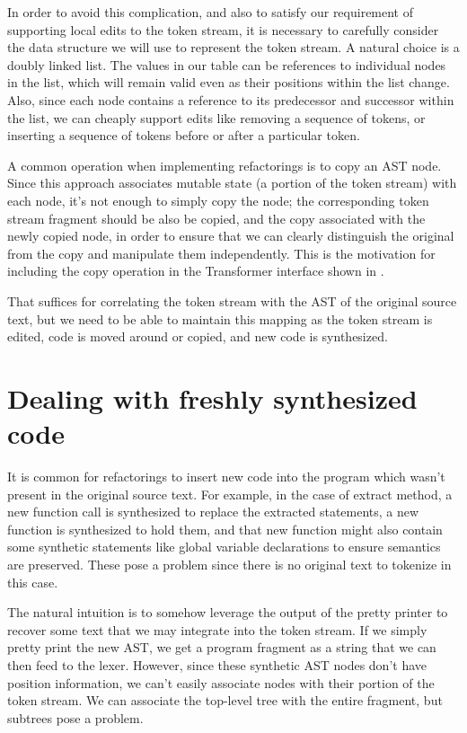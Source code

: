 In order to avoid this complication, and also to satisfy our requirement of
supporting local edits to the token stream, it is necessary to carefully
consider the data structure we will use to represent the token stream. A
natural choice is a doubly linked list. The values in our table can be
references to individual nodes in the list, which will remain valid even as
their positions within the list change. Also, since each node contains a
reference to its predecessor and successor within the list, we can cheaply
support edits like removing a sequence of tokens, or inserting a sequence of
tokens before or after a particular token.

A common operation when implementing refactorings is to copy an AST
node. Since this approach associates mutable state (a portion of the token
stream) with each node, it's not enough to simply copy the node; the
corresponding token stream fragment should be also be copied, and the copy
associated with the newly copied node, in order to ensure that we can clearly
distinguish the original from the copy and manipulate them independently.
This is the motivation for including the copy operation in the Transformer
interface shown in .

That suffices for correlating the token stream with the AST of the original
source text, but we need to be able to maintain this mapping as the token
stream is edited, code is moved around or copied, and new code is synthesized.

\section{Dealing with freshly synthesized code}

It is common for refactorings to insert new code into the program which wasn't
present in the original source text. For example, in the case of extract
method, a new function call is synthesized to replace the extracted statements,
a new function is synthesized to hold them, and that new function might also
contain some synthetic statements like global variable declarations to ensure
semantics are preserved. These pose a problem since there is no original text
to tokenize in this case.

The natural intuition is to somehow leverage the output of the pretty printer
to recover some text that we may integrate into the token stream. If we simply
pretty print the new AST, we get a program fragment as a string that we can
then feed to the lexer. However, since these synthetic AST nodes don't have
position information, we can't easily associate nodes with their portion of the
token stream. We can associate the top-level tree with the entire fragment, but
subtrees pose a problem.

